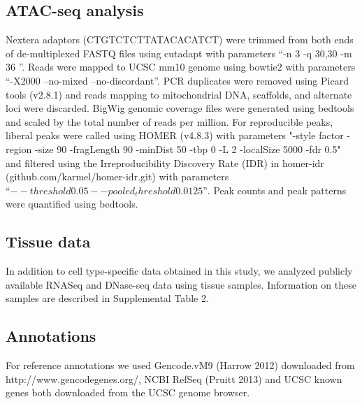 \subsection{ATAC-seq analysis}
Nextera adaptors (CTGTCTCTTATACACATCT) were trimmed from both ends of de-multiplexed FASTQ files using cutadapt with parameters “-n 3 -q 30,30 -m 36 ”. Reads were mapped to UCSC mm10 genome using bowtie2 with parameters “-X2000 --no-mixed --no-discordant”. PCR duplicates were removed using Picard tools (v2.8.1) and reads mapping to mitochondrial DNA, scaffolds, and alternate loci were discarded. BigWig genomic coverage files were generated using bedtools and scaled by the total number of reads per million. For reproducible peaks, liberal peaks were called using HOMER (v4.8.3) with parameters "-style factor -region -size 90 -fragLength 90 -minDist 50 -tbp 0 -L 2 -localSize 5000 -fdr 0.5" and filtered using the Irreproducibility Discovery Rate (IDR) in homer-idr (github.com/karmel/homer-idr.git) with parameters $“--threshold 0.05 --pooled_threshold 0.0125”$. Peak counts and peak patterns were quantified using bedtools.

\subsection{Tissue data}
In addition to cell type-specific data obtained in this study, we analyzed publicly available RNASeq and DNase-seq data using tissue samples. Information on these samples are described in Supplemental Table 2.

\subsection{Annotations}
For reference annotations we used Gencode.vM9 (Harrow 2012) downloaded from http://www.gencodegenes.org/, NCBI RefSeq (Pruitt 2013) and UCSC known genes both downloaded from the UCSC genome browser.

